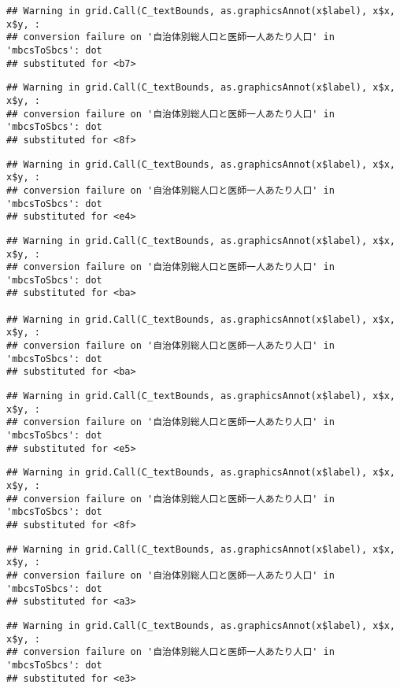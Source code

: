 \documentclass[
]{article}
\begin{document}
\begin{verbatim}
## Warning in grid.Call(C_textBounds, as.graphicsAnnot(x$label), x$x, x$y, :
## conversion failure on '自治体別総人口と医師一人あたり人口' in 'mbcsToSbcs': dot
## substituted for <b7>
\end{verbatim}

\begin{verbatim}
## Warning in grid.Call(C_textBounds, as.graphicsAnnot(x$label), x$x, x$y, :
## conversion failure on '自治体別総人口と医師一人あたり人口' in 'mbcsToSbcs': dot
## substituted for <8f>
\end{verbatim}

\begin{verbatim}
## Warning in grid.Call(C_textBounds, as.graphicsAnnot(x$label), x$x, x$y, :
## conversion failure on '自治体別総人口と医師一人あたり人口' in 'mbcsToSbcs': dot
## substituted for <e4>
\end{verbatim}

\begin{verbatim}
## Warning in grid.Call(C_textBounds, as.graphicsAnnot(x$label), x$x, x$y, :
## conversion failure on '自治体別総人口と医師一人あたり人口' in 'mbcsToSbcs': dot
## substituted for <ba>

## Warning in grid.Call(C_textBounds, as.graphicsAnnot(x$label), x$x, x$y, :
## conversion failure on '自治体別総人口と医師一人あたり人口' in 'mbcsToSbcs': dot
## substituted for <ba>
\end{verbatim}

\begin{verbatim}
## Warning in grid.Call(C_textBounds, as.graphicsAnnot(x$label), x$x, x$y, :
## conversion failure on '自治体別総人口と医師一人あたり人口' in 'mbcsToSbcs': dot
## substituted for <e5>
\end{verbatim}

\begin{verbatim}
## Warning in grid.Call(C_textBounds, as.graphicsAnnot(x$label), x$x, x$y, :
## conversion failure on '自治体別総人口と医師一人あたり人口' in 'mbcsToSbcs': dot
## substituted for <8f>
\end{verbatim}

\begin{verbatim}
## Warning in grid.Call(C_textBounds, as.graphicsAnnot(x$label), x$x, x$y, :
## conversion failure on '自治体別総人口と医師一人あたり人口' in 'mbcsToSbcs': dot
## substituted for <a3>
\end{verbatim}

\begin{verbatim}
## Warning in grid.Call(C_textBounds, as.graphicsAnnot(x$label), x$x, x$y, :
## conversion failure on '自治体別総人口と医師一人あたり人口' in 'mbcsToSbcs': dot
## substituted for <e3>
\end{verbatim}
\end{document}
